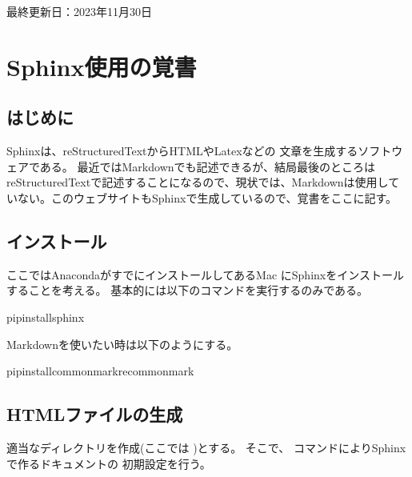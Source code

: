 \documentclass[letterpaper,10pt,dvipdfmx,report]{sphinxmanual}
\begin{document}
\sphinxAtStartPar
最終更新日：2023年11月30日

\sphinxstepscope


\chapter{Sphinx使用の覚書}
\label{\detokenize{sphinx:sphinx}}\label{\detokenize{sphinx::doc}}

\section{はじめに}
\label{\detokenize{sphinx:id1}}
\sphinxAtStartPar
Sphinxは、reStructuredTextからHTMLやLatexなどの
文章を生成するソフトウェアである。
最近ではMarkdownでも記述できるが、結局最後のところはreStructuredTextで記述することになるので、現状では、Markdownは使用していない。このウェブサイトもSphinxで生成しているので、覚書をここに記す。


\section{インストール}
\label{\detokenize{sphinx:id3}}
\sphinxAtStartPar
ここではAnacondaがすでにインストールしてあるMac
にSphinxをインストールすることを考える。
基本的には以下のコマンドを実行するのみである。

\begin{sphinxVerbatim}[commandchars=\\\{\}]
pipinstallsphinx
\end{sphinxVerbatim}

\sphinxAtStartPar
Markdownを使いたい時は以下のようにする。

\begin{sphinxVerbatim}[commandchars=\\\{\}]
pipinstallcommonmarkrecommonmark
\end{sphinxVerbatim}


\section{HTMLファイルの生成}
\label{\detokenize{sphinx:html}}
\sphinxAtStartPar
適当なディレクトリを作成(ここでは  )とする。
そこで、  コマンドによりSphinxで作るドキュメントの
初期設定を行う。
\end{document}
